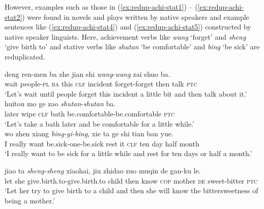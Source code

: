 \documentclass[11pt,a4paper,fleqn,draft]{article}
\let\textbf\emph
\begin{document}
However, examples such as those in (\ref{ex:redup-achi-stat1}) -- (\ref{ex:redup-achi-stat2}) were found in novels and plays written by native speakers and example sentences like (\ref{ex:redup-achi-stat4}) and (\ref{ex:redup-achi-stat5}) constructed by native speaker linguists.
Here, achievement verbs like \emph{wang} `forget' and \emph{sheng} `give birth to' and stative verbs like \emph{shutan} `be comfortable' and \emph{bing} `be sick' are reduplicated.

\ea
\ea\label{ex:redup-achi-stat1}
\gll deng ren-men ba zhe jian shi \textbf{wang}-\textbf{wang} zai shuo ba.\footnotemark\\
wait people-\textsc{pl} \textsc{ba} this \textsc{clf} incident forget-forget then talk \textsc{ptc}\\
\glt `Let's wait until people forget this incident a little bit and then talk about it.'\\

\ex\label{ex:redup-achi-stat2}
\gll huitou mo ge zao \textbf{shutan}-\textbf{shutan} ba.\footnotemark\\
later wipe \textsc{clf} bath be.comfortable-be.comfortable \textsc{ptc}\\
\glt `Let's take a bath later and be comfortable for a little while.'\\

\ex\label{ex:redup-achi-stat4}
\gll wo zhen xiang \textbf{bing-yi-bing}, xie ta ge shi tian ban yue.\\
I really want be.sick-one-be.sick rest it \textsc{clf} ten day half month\\ 
\glt `I really want to be sick for a little while and rest for ten days or half a month.'

\ex\label{ex:redup-achi-stat5}
\gll jiao ta \textbf{sheng-sheng} xiaohai, jiu zhidao zuo muqin de gan-ku le.\\
let she give.birth.to-give.birth.to child then know \textsc{cop} mother \textsc{de} sweet-bitter \textsc{ptc}\\ 
\glt `Let her try to give birth to a child and then she will know the bittersweetness of being a mother.'
\z
\z
\end{document}
